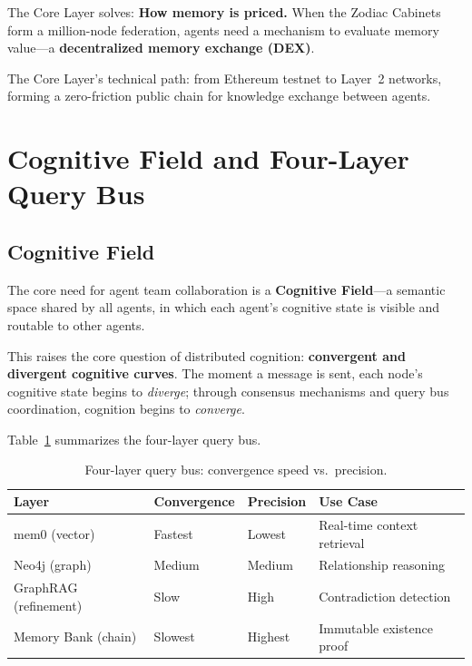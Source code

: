 \documentclass[11pt,a4paper]{article}
\begin{document}
The Core Layer solves: \textbf{How memory is priced.}
When the Zodiac Cabinets form a million-node federation, agents need a mechanism to evaluate memory value---a \textbf{decentralized memory exchange (DEX)}.

The Core Layer's technical path: from Ethereum testnet to Layer~2 networks, forming a zero-friction public chain for knowledge exchange between agents.

\section{Cognitive Field and Four-Layer Query Bus}
\label{sec:cognitive}

\subsection{Cognitive Field}
\label{sub:cognitive_field}

The core need for agent team collaboration is a \textbf{Cognitive Field}---a semantic space shared by all agents, in which each agent's cognitive state is visible and routable to other agents.

This raises the core question of distributed cognition: \textbf{convergent and divergent cognitive curves}.
The moment a message is sent, each node's cognitive state begins to \emph{diverge}; through consensus mechanisms and query bus coordination, cognition begins to \emph{converge}.

Table~\ref{tab:querybus} summarizes the four-layer query bus.

\begin{table}[ht]
\centering
\caption{Four-layer query bus: convergence speed vs.\ precision.}
\label{tab:querybus}
\small
\begin{tabular}{@{}llll@{}}
\toprule
\textbf{Layer} & \textbf{Convergence} & \textbf{Precision} & \textbf{Use Case} \\
\midrule
mem0 (vector)        & Fastest  & Lowest  & Real-time context retrieval \\
Neo4j (graph)        & Medium   & Medium  & Relationship reasoning      \\
GraphRAG (refinement)& Slow     & High    & Contradiction detection     \\
Memory Bank (chain)  & Slowest  & Highest & Immutable existence proof   \\
\bottomrule
\end{tabular}
\end{table}
\end{document}
